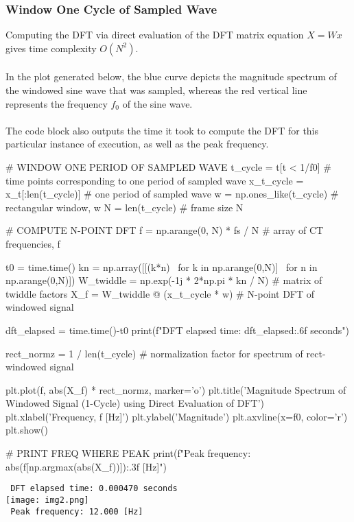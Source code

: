 \documentclass{report}
\begin{document}
\subsubsection{Window One Cycle of Sampled Wave}
Computing the DFT via direct evaluation of the DFT matrix equation $X=Wx$ gives time complexity $O(N^2)$.
\\ \\
In the plot generated below, the blue curve depicts the magnitude spectrum of the windowed sine wave that was sampled, 
whereas the red vertical line represents the frequency $f_0$ of the sine wave. 
\\ \\ 
The code block also outputs the time it took to compute the DFT for this particular instance of execution, as well as the peak frequency.
\begin{python}
# WINDOW ONE PERIOD OF SAMPLED WAVE
t_cycle = t[t < 1/f0]                  # time points corresponding to one period of sampled wave
x_t_cycle = x_t[:len(t_cycle)]         # one period of sampled wave
w = np.ones_like(t_cycle)              # rectangular window, w
N = len(t_cycle)                       # frame size N

# COMPUTE N-POINT DFT
f = np.arange(0, N) * fs / N           # array of CT frequencies, f

t0 = time.time()
kn = np.array([[(k*n) \
        for k in np.arange(0,N)] \
            for n in np.arange(0,N)])
W_twiddle = np.exp(-1j * 2*np.pi * kn / N)  # matrix of twiddle factors
X_f = W_twiddle @ (x_t_cycle * w)           # N-point DFT of windowed signal

dft_elapsed = time.time()-t0
print(f"DFT elapsed time: {dft_elapsed:.6f} seconds")

rect_normz = 1 / len(t_cycle)      # normalization factor for spectrum of rect-windowed signal

plt.plot(f, abs(X_f) * rect_normz, marker='o')
plt.title('Magnitude Spectrum of Windowed Signal (1-Cycle) \n using Direct Evaluation of DFT')
plt.xlabel('Frequency, f [Hz]')
plt.ylabel('Magnitude')
plt.axvline(x=f0, color='r')
plt.show()

# PRINT FREQ WHERE PEAK
print(f"Peak frequency: {abs(f[np.argmax(abs(X_f))]):.3f} [Hz]")
\end{python}
\texttt{ DFT elapsed time: 0.000470 seconds} \\ 
\texttt{[image: img2.png]} \\ 
\texttt{ Peak frequency: 12.000 [Hz]}
\\ \\
\end{document}
